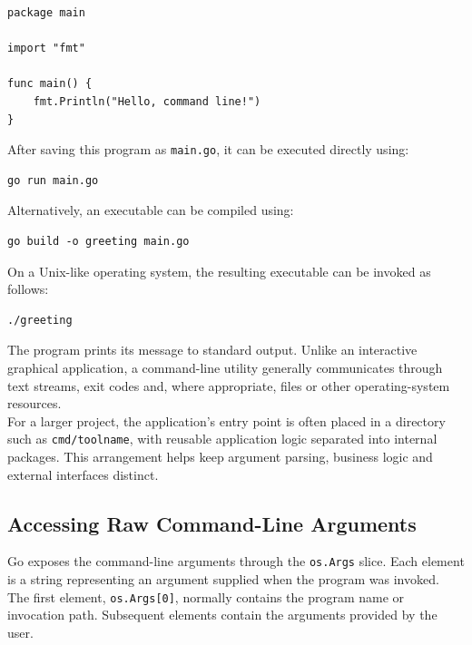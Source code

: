 \begin{lstlisting}
package main

import "fmt"

func main() {
    fmt.Println("Hello, command line!")
}
\end{lstlisting}

After saving this program as \texttt{main.go}, it can be executed directly using:

\begin{lstlisting}
go run main.go
\end{lstlisting}

Alternatively, an executable can be compiled using:

\begin{lstlisting}
go build -o greeting main.go
\end{lstlisting}

On a Unix-like operating system, the resulting executable can be invoked as follows:

\begin{lstlisting}
./greeting
\end{lstlisting}

The program prints its message to standard output. Unlike an interactive graphical application, a command-line utility generally communicates through text streams, exit codes and, where appropriate, files or other operating-system resources.\\

For a larger project, the application's entry point is often placed in a directory such as \texttt{cmd/toolname}, with reusable application logic separated into internal packages. This arrangement helps keep argument parsing, business logic and external interfaces distinct.\\

\subsection{Accessing Raw Command-Line Arguments}

Go exposes the command-line arguments through the \texttt{os.Args} slice. Each element is a string representing an argument supplied when the program was invoked.\\

The first element, \texttt{os.Args[0]}, normally contains the program name or invocation path. Subsequent elements contain the arguments provided by the user.\\

